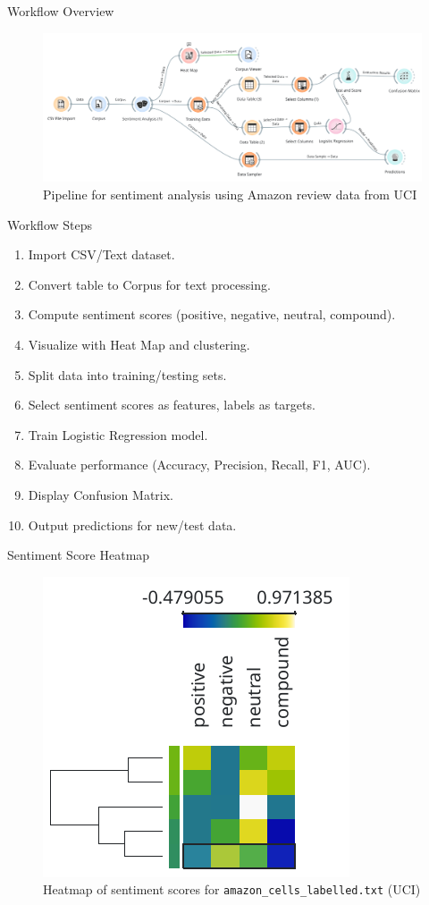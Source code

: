 \documentclass[aspectratio=169, table]{beamer}
\begin{document}
\begin{frame}{Workflow Overview}
	\vspace{20pt}
	\begin{figure}[h]
		\centering
		\includegraphics[width=\linewidth]{../../figures/sentiment_pipeline.png}
		\caption{Pipeline for sentiment analysis using Amazon review data from UCI}
	\end{figure}
\end{frame}

\begin{frame}{Workflow Steps}
	\begin{enumerate}
		\item Import CSV/Text dataset.
		\item Convert table to Corpus for text processing.
		\item Compute sentiment scores (positive, negative, neutral, compound).
		\item Visualize with Heat Map and clustering.
		\item Split data into training/testing sets.
		\item Select sentiment scores as features, labels as targets.
		\item Train Logistic Regression model.
		\item Evaluate performance (Accuracy, Precision, Recall, F1, AUC).
		\item Display Confusion Matrix.
		\item Output predictions for new/test data.
	\end{enumerate}
\end{frame}

\begin{frame}{Sentiment Score Heatmap}
	\vspace{20pt}
	\begin{figure}
		\centering
		\includegraphics[width=0.4\linewidth]{../../figures/sentiment_heatmap.png}
		\caption{Heatmap of sentiment scores for \texttt{amazon\_cells\_labelled.txt} (UCI)}
		\label{fig:sentiment-heatmap}
	\end{figure}
\end{frame}
\end{document}
